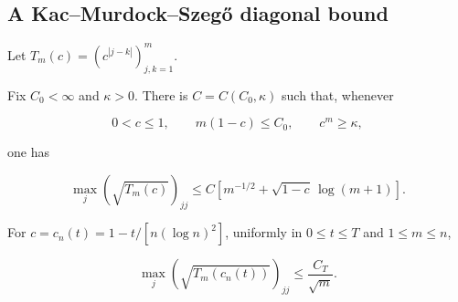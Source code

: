 \subsection{A Kac--Murdock--Szeg{\H o} diagonal bound}

Let \(T_m(c)=(c^{|j-k|})_{j,k=1}^m\).

\begin{lemma}
\label{lem:supp-kms-diagonal}
Fix \(C_0<\infty\) and \(\kappa>0\).  There is
\(C=C(C_0,\kappa)\) such that, whenever

\[
 0<c\le1,
 \qquad m(1-c)\le C_0,
 \qquad c^m\ge\kappa,
\]

one has

\begin{equation}\label{eq:supp-kms-bound}
 \max_j(\sqrt{T_m(c)})_{jj}
 \le C\left[m^{-1/2}+\sqrt{1-c}\,\log(m+1)\right].
\end{equation}

For \(c=c_n(t)=1-t/[n(\log n)^2]\), uniformly in
\(0\le t\le T\) and \(1\le m\le n\),

\begin{equation}\label{eq:supp-kms-critical}
 \max_j(\sqrt{T_m(c_n(t))})_{jj}\le\frac{C_T}{\sqrt m}.
\end{equation}
\end{lemma}

